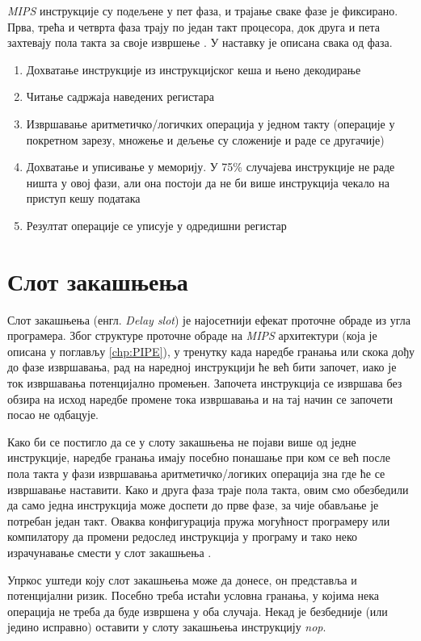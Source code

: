 \documentclass[12pt,oneside]{memoir}
\begin{document}
\textit{MIPS} инструкције су подељене у пет фаза, и трајање сваке фазе је фиксирано. Прва, трећа и четврта фаза
трају по један такт процесора, док друга и пета захтевају пола такта за своје извршење \cite{SMR}. У наставку је
описана свака од фаза.

\begin{enumerate}
	\item Дохватање инструкције из инструкцијског кеша и њено декодирање
	\item Читање садржаја наведених регистара
	\item Извршавање аритметичко/логичких операција у једном такту (операције у покретном зарезу, множење и дељење су
	сложеније и раде се другачије)
	\item Дохватање и уписивање у меморију. У 75\% случајева инструкције не раде ништа у овој фази, али она постоји
	да не би више инструкција чекало на приступ кешу података
	\item Резултат операције се уписује у одредишни регистар
\end{enumerate}

\section{Слот закашњења} \label{chp:DELAY}

Слот закашњења (енгл. \textit{Delay slot}) је најосетнији ефекат проточне обраде из угла програмера. Због структуре
проточне обраде на \textit{MIPS} архитектури (која је описана у поглављу \ref{chp:PIPE}), у тренутку када наредбе
гранања или скока дођу до фазе извршавања, рад на наредној инструкцији ће већ бити започет, иако је ток извршавања
потенцијално промењен. Започета инструкција се извршава без обзира на исход наредбе промене тока извршавања и на тај
начин се започети посао не одбацује.

Како би се постигло да се у слоту закашњења не појави више од једне инструкције, наредбе гранања имају посебно
понашање при ком се већ после пола такта у фази извршавања аритметичко/логиких операција зна где ће се извршавање
наставити. Како и друга фаза траје пола такта, овим смо обезбедили да само једна инструкција може доспети до прве
фазе, за чије обављање је потребан један такт. Оваква конфигурација пружа могућност програмеру или компилатору да
промени редослед инструкција у програму и тако неко израчунавање смести у слот закашњења \cite{SMR}.

Упркос уштеди коју слот закашњења може да донесе, он представља и потенцијални ризик. Посебно треба истаћи условна
гранања, у којима нека операција не треба да буде извршена у оба случаја. Некад је безбедније (или једино исправно)
оставити у слоту закашњења инструкцију \textit{nop}.
\end{document}
